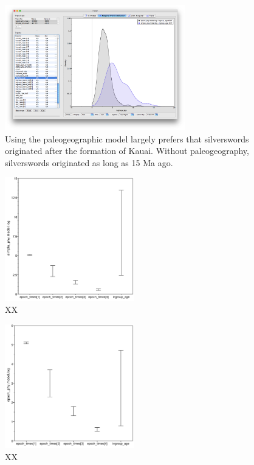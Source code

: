 \begin{figure}[!ht]
\centering
\includegraphics[width=0.7\textwidth]{figures/fig_biogeo_dating_ingroup_age.png}
\caption{Using the paleogeographic model largely prefers that silverswords originated after the formation of Kauai. Without paleogeography, silverswords originated as long as 15 Ma ago.}
\end{figure}


\begin{figure}[!ht]
\centering
\includegraphics[width=0.5\textwidth]{figures/fig_simple_ages.pdf}
\caption{XX}
\label{fig:fig_simple_ages}
\end{figure}

\begin{figure}[!ht]
\centering
\includegraphics[width=0.5\textwidth]{figures/fig_epoch_ages.pdf}
\caption{XX}
\label{fig:fig_epoch_ages}
\end{figure}


